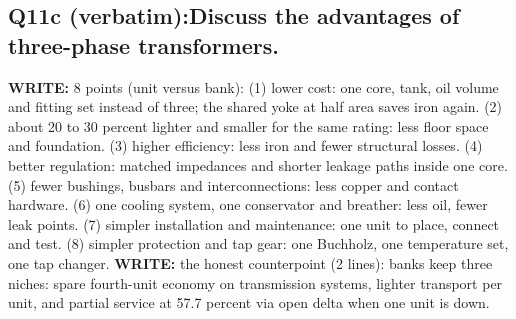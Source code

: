 \documentclass[11pt]{article}
\newcommand{\q}[2]{\subsection*{\color{copper}#1\quad\color{iron}#2}}
\newcommand{\w}[1]{\textbf{\color{copper}WRITE:} #1}
\begin{document}
\q{Q11c (verbatim):}{Discuss the advantages of three-phase transformers.}
\w{8 points (unit versus bank):} (1) lower cost: one core, tank, oil volume and fitting set instead of three; the shared yoke at half area saves iron again. (2) about 20 to 30 percent lighter and smaller for the same rating: less floor space and foundation. (3) higher efficiency: less iron and fewer structural losses. (4) better regulation: matched impedances and shorter leakage paths inside one core. (5) fewer bushings, busbars and interconnections: less copper and contact hardware. (6) one cooling system, one conservator and breather: less oil, fewer leak points. (7) simpler installation and maintenance: one unit to place, connect and test. (8) simpler protection and tap gear: one Buchholz, one temperature set, one tap changer.
\w{the honest counterpoint (2 lines):} banks keep three niches: spare fourth-unit economy on transmission systems, lighter transport per unit, and partial service at 57.7 percent via open delta when one unit is down.
\end{document}
